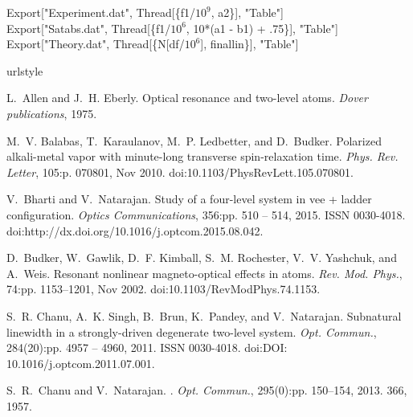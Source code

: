 \begin{enumerate}
{Export["Experiment.dat", Thread[\{f1/$10^{9}$, a2\}], "Table"]\\
Export["Satabs.dat", Thread[\{f1/$10^{6}$, 10*(a1 - b1) + .75\}], "Table"]\\
Export["Theory.dat", Thread[\{N[df/$10^{6}$], finallin\}], "Table"]\\



\begin{thebibliography}{99}
\providecommand{\url}[1]{\texttt{#1}}
\providecommand{\urlprefix}{URL }
\expandafter\ifx\csname urlstyle\endcsname\relax
  \providecommand{\doi}[1]{doi:\discretionary{}{}{}#1}\else
  \providecommand{\doi}{doi:\discretionary{}{}{}\begingroup
  \urlstyle{rm}\Url}\fi

L.~Allen and J.~H. Eberly.
\newblock Optical resonance and two-level atoms.
\newblock \emph{Dover publications}, 1975.

M.~V. Balabas, T.~Karaulanov, M.~P. Ledbetter, and D.~Budker.
\newblock Polarized alkali-metal vapor with minute-long transverse
  spin-relaxation time.
\newblock \emph{Phys. Rev. Letter}, 105:p. 070801, Nov 2010.
\newblock \doi{10.1103/PhysRevLett.105.070801}.

V.~Bharti and V.~Natarajan.
\newblock Study of a four-level system in vee + ladder configuration.
\newblock \emph{Optics Communications}, 356:pp. 510 -- 514, 2015.
\newblock ISSN 0030-4018.
\newblock \doi{http://dx.doi.org/10.1016/j.optcom.2015.08.042}.

D.~Budker, W.~Gawlik, D.~F. Kimball, S.~M. Rochester, V.~V. Yashchuk, and
  A.~Weis.
\newblock Resonant nonlinear magneto-optical effects in atoms.
\newblock \emph{Rev. Mod. Phys.}, 74:pp. 1153--1201, Nov 2002.
\newblock \doi{10.1103/RevModPhys.74.1153}.

S.~R. Chanu, A.~K. Singh, B.~Brun, K.~Pandey, and V.~Natarajan.
\newblock Subnatural linewidth in a strongly-driven degenerate two-level
  system.
\newblock \emph{Opt. Commun.}, 284(20):pp. 4957 -- 4960, 2011.
\newblock ISSN 0030-4018.
\newblock \doi{DOI: 10.1016/j.optcom.2011.07.001}.

S.~R.~Chanu and V.~Natarajan.
.
\newblock \emph{Opt. Commun.}, 295(0):pp. 150--154, 2013.
366, 1957.


\end{thebibliography}}
\end{enumerate}
